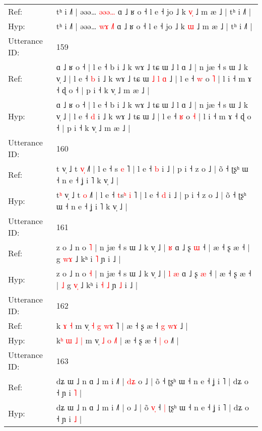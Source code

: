 \documentclass[10pt]{article}
\DeclareRobustCommand{\hl}[1]{{\textcolor{red}{#1}}}
\begin{document}
\begin{longtable}{ll}
Ref: & tʰ i ˩˥ | əəə… \hl{}\hl{ə}\hl{ə}\hl{ə}\hl{…} ɑ ˩ ʁ o ˧ l e ˧ jo ˩ k \hl{v}\hl{̩} ˩ m æ ˩ | tʰ i ˩˥ |
 \\
Hyp: & tʰ i ˩˥ | əəə… \hl{w}\hl{ɤ}\hl{ }\hl{˩}\hl{˥} ɑ ˩ ʁ o ˧ l e ˧ jo ˩ k \hl{}\hl{ɯ} ˩ m æ ˩ | tʰ i ˩˥ |
 \\
\midrule
Utterance ID: & 159 \\
Ref: & ɑ ˩ ʁ o ˧ | l e ˧ b i ˩ k wɤ ˩ tɕ ɯ ˩ l ɑ ˩ | n jæ ˧ s ɯ ˩ k v̩ ˩ | l e ˧ \hl{b} i ˩ k wɤ ˩ tɕ ɯ\hl{ }\hl{˩}\hl{ }\hl{l}\hl{ }\hl{ɑ} ˩ | l e ˧ \hl{w} o \hl{˥} | l i ˧ m ɤ ˧ ɖ o ˧ | p i ˧ k v̩ ˩ m æ ˩ |
 \\
Hyp: & ɑ ˩ ʁ o ˧ | l e ˧ b i ˩ k wɤ ˩ tɕ ɯ ˩ l ɑ ˩ | n jæ ˧ s ɯ ˩ k v̩ ˩ | l e ˧ \hl{d} i ˩ k wɤ ˩ tɕ ɯ\hl{}\hl{}\hl{}\hl{}\hl{}\hl{} ˩ | l e ˧ \hl{ʁ} o \hl{˧} | l i ˧ m ɤ ˧ ɖ o ˧ | p i ˧ k v̩ ˩ m æ ˩ |
 \\
\midrule
Utterance ID: & 160 \\
Ref: & t\hl{} v̩ ˩ t \hl{v}\hl{̩} ˩˥ | l e ˧ \hl{}s\hl{} \hl{e} ˥ | l e ˧ \hl{b} i ˩ | p i ˧ z o ˩ | õ ˧ ʈʂʰ ɯ ˧ n e ˧ ʝ i ˥ k v̩ ˩ |
 \\
Hyp: & t\hl{ʰ} v̩ ˩ t \hl{}\hl{o} ˩˥ | l e ˧ \hl{t}s\hl{ʰ} \hl{i} ˥ | l e ˧ \hl{d} i ˩ | p i ˧ z o ˩ | õ ˧ ʈʂʰ ɯ ˧ n e ˧ ʝ i ˥ k v̩ ˩ |
 \\
\midrule
Utterance ID: & 161 \\
Ref: & z o ˩ n o \hl{˥} | n jæ ˧ s ɯ ˩ k v̩ ˩ |\hl{}\hl{} \hl{ʁ} ɑ ˩ ʂ \hl{ɯ} ˧ | æ ˧ ʂ æ ˧ |\hl{}\hl{} g \hl{w}\hl{ɤ} ˩ kʰ i\hl{}\hl{} \hl{˥} ɲ\hl{}\hl{} i ˩ |
 \\
Hyp: & z o ˩ n o \hl{˧} | n jæ ˧ s ɯ ˩ k v̩ ˩ |\hl{ }\hl{l} \hl{æ} ɑ ˩ ʂ \hl{æ} ˧ | æ ˧ ʂ æ ˧ |\hl{ }\hl{˩} g \hl{v}\hl{̩} ˩ kʰ i\hl{ }\hl{˧} \hl{˩} ɲ\hl{ }\hl{˩} i ˩ |
 \\
\midrule
Utterance ID: & 162 \\
Ref: & k\hl{}\hl{}\hl{} \hl{ɤ} \hl{˧} m v̩ \hl{˧} \hl{g} \hl{w}\hl{ɤ}\hl{ }˥ | æ ˧ ʂ æ ˧ \hl{g} \hl{w}\hl{ɤ} ˩\hl{} |
 \\
Hyp: & k\hl{ʰ}\hl{ }\hl{ɯ} \hl{˩} \hl{|} m v̩ \hl{˩} \hl{o} \hl{}\hl{}\hl{˩}˥ | æ ˧ ʂ æ ˧ \hl{|} \hl{}\hl{o} ˩\hl{˥} |
 \\
\midrule
Utterance ID: & 163 \\
Ref: & dʑ ɯ ˩ n ɑ ˩ m i ˩˥ |\hl{ }\hl{d}\hl{ʑ} o ˩ | õ\hl{}\hl{}\hl{} ˧\hl{}\hl{} ʈʂʰ ɯ ˧ n e ˧ ʝ i ˥ | dʑ o ˧ ɲ i \hl{˥} |
 \\
Hyp: & dʑ ɯ ˩ n ɑ ˩ m i ˩˥ |\hl{}\hl{}\hl{} o ˩ | õ\hl{ }\hl{v}\hl{̩} ˧\hl{ }\hl{|} ʈʂʰ ɯ ˧ n e ˧ ʝ i ˥ | dʑ o ˧ ɲ i \hl{˩} |
 \\
\midrule
\end{longtable}
\end{document}
